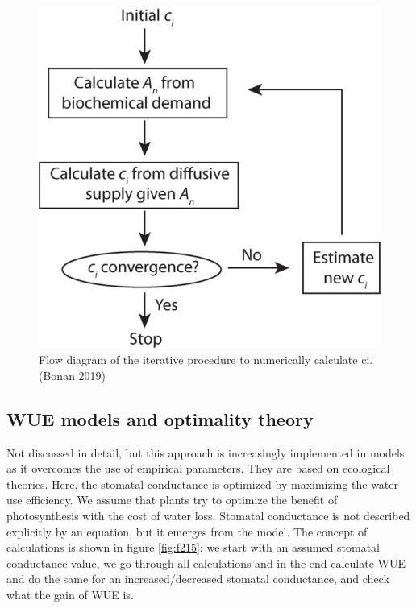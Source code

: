 \documentclass[12pt,oneside]{book}
\begin{document}
\begin{figure}

{\centering \includegraphics[width=0.8\linewidth]{figures/chap2/numerical_solution} 

}

\caption{Flow diagram of the iterative procedure to numerically calculate ci.(Bonan 2019)}\label{fig:f214}
\end{figure}

\subsection{WUE models and optimality
theory}\label{wue-models-and-optimality-theory}

Not discussed in detail, but this approach is increasingly implemented
in models as it overcomes the use of empirical parameters. They are
based on ecological theories. Here, the stomatal conductance is
optimized by maximizing the water use efficiency. We assume that plants
try to optimize the benefit of photosynthesis with the cost of water
loss. Stomatal conductance is not described explicitly by an equation,
but it emerges from the model. The concept of calculations is shown in
figure \ref{fig:f215}: we start with an assumed stomatal conductance
value, we go through all calculations and in the end calculate WUE and
do the same for an increased/decreased stomatal conductance, and check
what the gain of WUE is.
\end{document}
